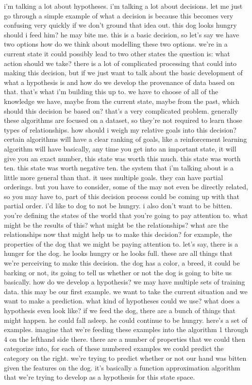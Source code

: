 i'm talking a lot about hypotheses.
i'm talking a lot about decisions.
let me just go through a simple example of what a decision is because this becomes very confusing very quickly if we don't ground that idea out.
this dog looks hungry should i feed him?
he may bite me.
this is a basic decision, so let's say we have two options
how do we think about modelling these two options.
we're in a current state
it could possibly lead to two other states
the question is: what action should we take?
there is a lot of complicated processing that could into making this decision, but if we just want to talk about the basic development of what a hypothesis is and how do we develop the provenance of data based on that.
that's what i'm building this up to.
we have to choose of all of the knowledge we have, maybe from the current state, maybe from the past, which should this decision be based on?
that's a very complicated problem.
generally these algorithms are focused on a dataset, so they're not required to learn those types of relationships.
how should i weigh my relative goals into this decision?
certain algorithms will have a clear ranking of goals, like a reinforcement learning algorithm will have basically, any time you get into an important state, it will give you an exact number, this state was worth this much.
this state was worth ten.
this state was worth negative ten.
the system that i'm talking about is a little more general than that.
it uses multiple goals.
they can have partial orderings.
but you have to consider, some of the may not even be directly related, so you may have to, part of this decision process could be coming up with that partial order.
i'd like to dog to not be hungry.
i also don't want to be bitten.
you're defining the states of the world that you're going to pay attention to.
what might be the results of this?
what might be the relationships?
what are the relationships now that might help us to make this decision?
for example, the properties of the dog that we might be paying attention to.
let's say, there is a hunger for the dog.
he looks hungry or he looks full.
these are all things that we're perceiving to make this decision.
the dog has a color, a breed, it could be barking or not, its going to tell us whether or not the dog is going to bite us basically.
how do we develop a hypothesis?
we may have multiple sets of training data.
this may be our first example.
we want to take the current situation and we want to make a prediction.
what kind of hypotheses could we use?
what does a hypothesis even look like?
if we feed the dog, there are a bunch of things that might happen.
he could fall asleep.
he could continue to be hungry.
here's a set of examples.
imagine that we're feeding these examples into the algorithm 1 through 4 on the lefthand side there.
there are a number of properties that we could then categorize into, for each of these numbered examples we could predict the category on the right.
we're trying to predict whether or not our hand was bitten given the features on the dog.
it's basically a function approximation algorithm that we're trying to develop as a hypothesis for this state space.

